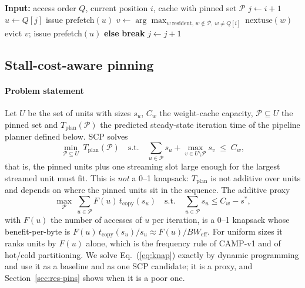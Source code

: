 \documentclass[preprint,12pt]{elsarticle}
\newcommand{\camp}{\textsc{CAMP}}
\newcommand{\bwlink}{BW_{\mathrm{eff}}}
\begin{document}
\begin{algorithm}[t]
\caption{Work-conserving prefetch controller (invoked at layer start, layer begin and every copy completion)}
\label{alg:prefetch}
\begin{algorithmic}[1]
\State \textbf{Input:} access order $Q$, current position $i$, cache with pinned set $\mathcal P$
\State $j \gets i+1$
  \State $u \gets Q[j]$
      \State issue prefetch$(u)$
    \Else
      \State $v \gets \arg\max_{w\ \mathrm{resident},\,w\notin\mathcal P,\,w\ne Q[i]}\ \mathrm{nextuse}(w)$
       evict $v$; issue prefetch$(u)$ \textbf{else} \textbf{break} \EndIf
    \EndIf
  \EndIf
  \State $j \gets j+1$
\EndWhile
\end{algorithmic}
\end{algorithm}

\subsection{Stall-cost-aware pinning}
\label{sec:scp}

\paragraph{Problem statement}
Let $U$ be the set of units with sizes $s_u$, $C_w$ the weight-cache capacity, $\mathcal P\subseteq U$ the pinned set and $T_{\mathrm{plan}}(\mathcal P)$ the predicted steady-state iteration time of the pipeline planner defined below. SCP solves
\begin{equation}
\min_{\mathcal P\subseteq U}\ T_{\mathrm{plan}}(\mathcal P)\quad\text{s.t.}\quad \sum_{u\in\mathcal P}s_u + \max_{v\in U\setminus\mathcal P}s_v \;\le\; C_w ,
\label{eq:scp}
\end{equation}
that is, the pinned units plus one streaming slot large enough for the largest streamed unit must fit. This is \emph{not} a 0--1 knapsack: $T_{\mathrm{plan}}$ is not additive over units and depends on where the pinned units sit in the sequence. The additive proxy
\begin{equation}
\max_{\mathcal P}\ \sum_{u\in\mathcal P}F(u)\,t_{\mathrm{copy}}(s_u)\quad\text{s.t.}\quad \sum_{u\in\mathcal P}s_u \le C_w - s^\ast ,
\label{eq:knap}
\end{equation}
with $F(u)$ the number of accesses of $u$ per iteration, is a 0--1 knapsack whose benefit-per-byte is $F(u)\,t_{\mathrm{copy}}(s_u)/s_u\approx F(u)/\bwlink$. For uniform sizes it ranks units by $F(u)$ alone, which is the frequency rule of \camp-v1 and of hot/cold partitioning. We solve Eq.~(\ref{eq:knap}) exactly by dynamic programming and use it as a baseline and as one SCP candidate; it is a proxy, and Section~\ref{sec:res-pins} shows when it is a poor one.
\end{document}

